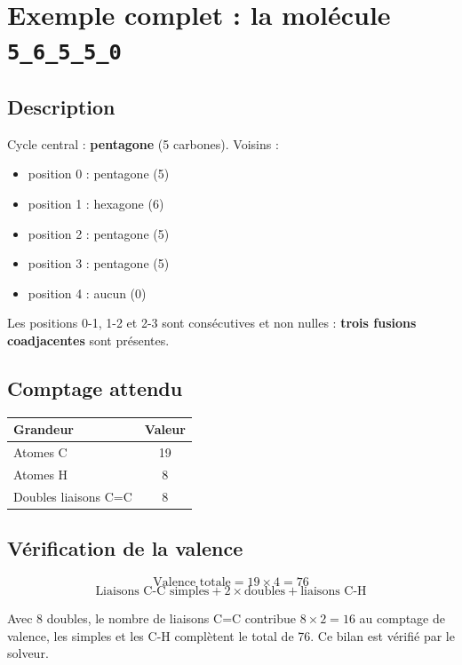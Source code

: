 \documentclass[a4paper,12pt]{article}
\begin{document}
\section{Exemple complet : la molécule \texttt{5\_6\_5\_5\_0}}

\subsection{Description}

Cycle central : \textbf{pentagone} (5 carbones). Voisins :
\begin{itemize}
  \item position 0 : pentagone (5)
  \item position 1 : hexagone (6)
  \item position 2 : pentagone (5)
  \item position 3 : pentagone (5)
  \item position 4 : aucun (0)
\end{itemize}

Les positions 0-1, 1-2 et 2-3 sont consécutives et non nulles : \textbf{trois fusions
coadjacentes} sont présentes.

\subsection{Comptage attendu}

\begin{center}
\begin{tabular}{lc}
  \toprule
  Grandeur & Valeur \\
  \midrule
  Atomes C & 19 \\
  Atomes H & 8 \\
  Doubles liaisons C=C & 8 \\
  \bottomrule
\end{tabular}
\end{center}

\subsection{Vérification de la valence}

\[
  \text{Valence totale} = 19 \times 4 = 76
\]
\[
  \text{Liaisons C-C simples} + 2 \times \text{doubles} + \text{liaisons C-H}
\]

Avec 8 doubles, le nombre de liaisons C=C contribue $8 \times 2 = 16$ au comptage de valence,
les simples et les C-H complètent le total de 76. Ce bilan est vérifié par le solveur.
\end{document}
